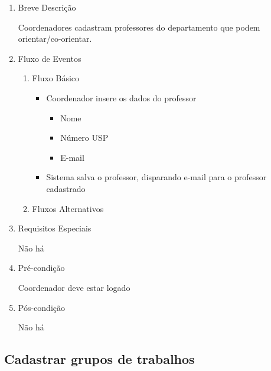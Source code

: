\begin{enumerate}
    \item Breve Descrição


Coordenadores cadastram professores do departamento que podem orientar/co-orientar.


    \item Fluxo de Eventos

\begin{enumerate}
    \item Fluxo Básico

\begin{itemize}
    \item Coordenador insere os dados do professor

\begin{itemize}
    \item Nome 

    \item Número USP

    \item E-mail


\end{itemize}
    \item Sistema salva o professor, disparando e-mail para o professor cadastrado
\end{itemize}


    \item Fluxos Alternativos



\end{enumerate}
    \item Requisitos Especiais


Não há


    \item Pré-condição


Coordenador deve estar logado


    \item Pós-condição

    Não há
\end{enumerate}




















\subsection{Cadastrar grupos de trabalhos}


